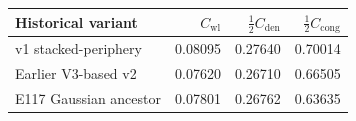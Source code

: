 \begin{tabular}{lrrr}
\toprule
Historical variant & $C_{\mathrm{wl}}$ & $\tfrac12 C_{\mathrm{den}}$ & $\tfrac12 C_{\mathrm{cong}}$ \\
\midrule
v1 stacked-periphery & 0.08095 & 0.27640 & 0.70014 \\
Earlier V3-based v2 & 0.07620 & 0.26710 & 0.66505 \\
E117 Gaussian ancestor & 0.07801 & 0.26762 & 0.63635 \\
\bottomrule
\end{tabular}
